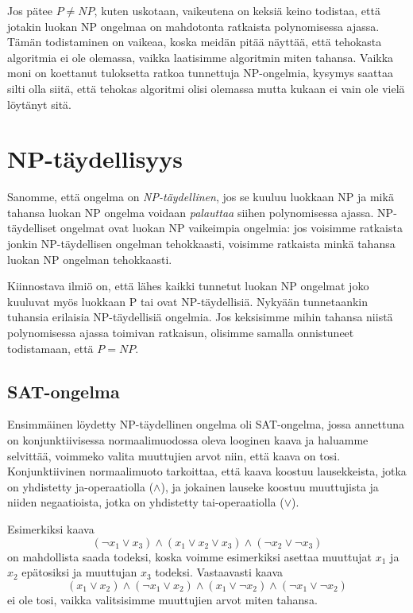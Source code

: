 Jos pätee $P \neq NP$, kuten uskotaan,
vaikeutena on keksiä keino todistaa, että jotakin
luokan NP ongelmaa on mahdotonta ratkaista
polynomisessa ajassa.
Tämän todistaminen on vaikeaa, koska meidän pitää näyttää,
että tehokasta algoritmia ei ole olemassa,
vaikka laatisimme algoritmin miten tahansa.
Vaikka moni on koettanut tuloksetta ratkoa
tunnettuja NP-ongelmia, kysymys saattaa silti olla siitä,
että tehokas algoritmi olisi olemassa mutta kukaan ei
vain ole vielä löytänyt sitä.

\section{NP-täydellisyys}

Sanomme, että ongelma on \emph{NP-täydellinen},
jos se kuuluu luokkaan NP ja mikä tahansa luokan NP
ongelma voidaan \emph{palauttaa} siihen polynomisessa ajassa.
NP-täydelliset ongelmat ovat luokan NP vaikeimpia ongelmia:
jos voisimme ratkaista jonkin NP-täydellisen ongelman tehokkaasti,
voisimme ratkaista minkä tahansa luokan NP ongelman tehokkaasti.

Kiinnostava ilmiö on, että lähes kaikki tunnetut luokan NP
ongelmat joko kuuluvat myös luokkaan P tai ovat
NP-täydellisiä.
Nykyään tunnetaankin tuhansia erilaisia NP-täydellisiä ongelmia.
Jos keksisimme mihin tahansa niistä polynomisessa ajassa toimivan
ratkaisun, olisimme samalla onnistuneet todistamaan, että $P=NP$.

\subsection{SAT-ongelma}

Ensimmäinen löydetty NP-täydellinen ongelma oli
SAT-ongelma, jossa annettuna on konjunktiivisessa
normaalimuodossa oleva looginen kaava ja haluamme
selvittää, voimmeko valita muuttujien arvot niin,
että kaava on tosi.
Konjunktiivinen normaalimuoto tarkoittaa,
että kaava koostuu lausekkeista, jotka on yhdistetty
ja-operaatiolla ($\land$), ja jokainen lauseke koostuu
muuttujista ja niiden negaatioista, jotka on yhdistetty
tai-operaatiolla ($\lor$).

Esimerkiksi kaava
\[(\neg x_1 \lor x_3) \land (x_1 \lor x_2 \lor x_3) \land (\neg x_2 \lor \neg x_3)\]
on mahdollista saada todeksi, koska voimme esimerkiksi asettaa
muuttujat $x_1$ ja $x_2$ epätosiksi ja muuttujan $x_3$ todeksi.
Vastaavasti kaava
\[(x_1 \lor x_2) \land (\neg x_1 \lor x_2) \land (x_1 \lor \neg x_2) \land (\neg x_1 \lor \neg x_2) \]
ei ole tosi, vaikka valitsisimme muuttujien arvot miten tahansa.

